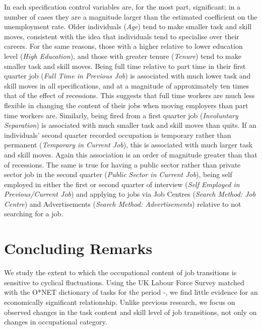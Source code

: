 \documentclass[11pt, oneside]{article}
\begin{document}
In each specification control variables are, for the most part, significant; in a number of cases they are a magnitude larger than the estimated coefficient on the unemployment rate. Older individuals (\textit{Age}) tend to make smaller task and skill moves, consistent with the idea that individuals tend to specialise over their careers. For the same reasons, those with a higher relative to lower education level (\textit{High Education}), and those with greater tenure  (\textit{Tenure}) tend to make smaller task and skill moves. Being full time relative to part time in their first quarter job (\textit{Full Time in Previous Job}) is associated with much lower task and skill moves in all specifications, and at a magnitude of approximately ten times that of the effect of recessions. This suggests that full time workers are much less flexible in changing the content of their jobs when moving employers than part time workers are. Similarly, being fired from a first quarter job (\textit{Involuntary Separation}) is associated with much smaller task and skill moves than quits.
If an individuals' second quarter recorded occupation is temporary rather than permanent (\textit{Temporary in Current Job}), this is associated with much larger task and skill moves. Again this association is an order of magnitude greater than that of recessions. The same is true for having a public sector rather than private sector job in the second quarter (\textit{Public Sector in Current Job}), being self employed in either the first or second quarter of interview (\textit{Self Employed in Previous/Current Job}) and applying to jobs via Job Centres (\textit{Search Method: Job Centre}) and Advertisements (\textit{Search Method: Advertisements}) relative to not searching for a job.
	

	\section{Concluding Remarks}
	\label{sec:Conclusion}
	
We study the extent to which the occupational content of job transitions is sensitive to cyclical fluctuations. Using the UK Labour Force Survey matched with the O*NET dictionary of tasks for the period \hspace{-1mm}-\hspace{-1mm}, we find little evidence for an economically significant relationship. Unlike previous research, we focus on observed changes in the task content and skill level of job transitions, not only on changes in occupational category. 
\end{document}
